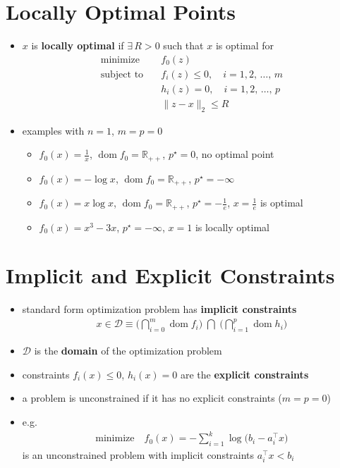 \documentclass[11pt]{extarticle}
\newcommand{\ds}{\displaystyle}
\DeclareMathOperator*{\dom}{dom}
\theoremstyle{definition}
\begin{document}
\newpage

\section*{Locally Optimal Points}

\begin{itemize}
  \item $x$ is {\bf locally optimal} if $\exists\,R > 0$ such that $x$ is optimal for
    \begin{align*}
      \text{minimize}\quad &f_0(z) \\
      \text{subject to}\quad &f_i(z)\leqslant 0, \quad i = 1, 2,\,\ldots,\,m \\
      \qquad\qquad &h_i(z) = 0, \quad i = 1, 2,\,\ldots,\,p \\
      \qquad\qquad &\|z - x\|_2 \leqslant R
    \end{align*}
  \item examples with $n = 1$, $m = p = 0$
    \begin{itemize}
      \item $\ds f_0(x) = \frac{1}{x}$, $\dom f_0 = \mathbb{R}_{++}$, $\ds p^\star = 0$, no optimal point
      \item $\ds f_0(x) = -\log x$, $\dom f_0 = \mathbb{R}_{++}$, $\ds p^\star = -\infty$
      \item $\ds f_0(x) = x\log x$, $\dom f_0 = \mathbb{R}_{++}$, $\ds p^\star = -\frac{1}{e}$, $\ds x = \frac{1}{e}$ is optimal 
      \item $\ds f_0(x) = x^3 - 3x$, $\ds p^\star = -\infty$, $\ds x = 1$ is locally optimal
    \end{itemize}
\end{itemize}

\newpage

\section*{Implicit and Explicit Constraints}
\begin{itemize}
  \item standard form optimization problem has {\bf implicit constraints}
    \begin{align*}
      x\in\mathcal{D}\equiv\bigg(\bigcap_{i = 0}^m\dom f_i\bigg)\;\bigcap\;\bigg(\bigcap_{i = 1}^p \dom h_i\bigg)
    \end{align*}
  \item $\mathcal{D}$ is the {\bf domain} of the optimization problem
  \item constraints $\ds f_i(x)\leqslant 0$, $\ds h_i(x) = 0$ are the {\bf explicit constraints}
  \item a problem is unconstrained if it has no explicit constraints ($m = p = 0$)
  \item e.g.
    \begin{align*}
      \text{minimize}\quad f_0(x) = -\sum_{i = 1}^k \log\big(b_i - a^\top_i x\big)  
    \end{align*}
    is an unconstrained problem with implicit constraints $a^\top_i x < b_i$
\end{itemize}
\end{document}
